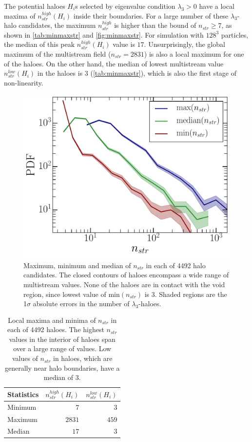\documentclass[fleqn,usenatbib,useAMS]{mnras}
\begin{document}
The potential haloes $H_i$s selected by eigenvalue condition $\lambda_3 > 0$ have a local maxima of $n_{str}^{high}(H_i)$ inside their boundaries. For a large number of these $\lambda_3$-halo candidates, the maximum $n_{str}^{high}$ is higher than the bound of $n_{str} \geq 7$, as shown in \autoref{tab:minmaxstr} and \autoref{fig:minmaxstr}. For simulation with $128^3$ particles, the median of this peak $n_{str}^{high}(H_i)$ value is $17$. Unsurprisingly, the global maximum of the multistream field ($n_{str} = 2831$) is also a local maximum for one of the haloes. On the other hand, the median of lowest multistream value $n_{str}^{low}(H_i)$ in the haloes is 3 (\autoref{tab:minmaxstr}), which is also the first stage of non-linearity. 


\begin{figure}
\begin{minipage}[t]{.99\linewidth}
 \centering\includegraphics[width=8.cm]{fig8.pdf} 
\end{minipage}\hfill
\caption{Maximum, minimum and median of $n_{str}$ in each of 4492 halo candidates. The closed contours of haloes encompass a wide range of multistream values. None of the haloes are in contact with the void region, since lowest value of min$(n_{str})$ is 3. Shaded regions are the 1$\sigma$ absolute errors in the number of $\lambda_3$-haloes. }
\label{fig:minmaxstr}
\end{figure}


\begin{table}
\caption{Local maxima and minima of $n_{str}$ in each of 4492 haloes. The highest $n_{str}$ values in the interior of haloes span over a large range of values. Low values of $n_{str}$ in haloes, which are generally near halo boundaries, have a median of 3.}
\begin{tabular}{|l|r|r|}
\hline
Statistics  &  $n_{str}^{high}(H_i)$ & $n_{str}^{low}(H_i)$ \\ \hline
Minimum     & $7$    & $3$  \\ \hline
Maximum     & $2831$ & $459$      \\ \hline
Median      & $17$   & $3$   \\ \hline
\end{tabular}
\label{tab:minmaxstr}
\end{table}
\end{document}
